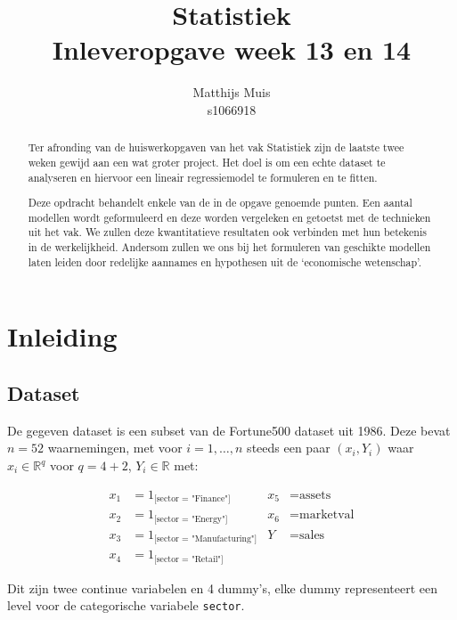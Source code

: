 \documentclass[a4paper]{report}
\author{
	Matthijs Muis \\
	s1066918
}
\title{
	Statistiek \\
	Inleveropgave week 13 en 14
}
\begin{document}
\maketitle

\begin{abstract}
  Ter afronding van de huiswerkopgaven van het vak Statistiek zijn de laatste twee weken gewijd aan een wat groter project. Het doel is om een echte dataset te analyseren en hiervoor een lineair regressiemodel te formuleren en te fitten.

  Deze opdracht behandelt enkele van de in de opgave genoemde punten. Een aantal modellen wordt geformuleerd en deze worden vergeleken en getoetst met de technieken uit het vak. We zullen deze kwantitatieve resultaten ook verbinden met hun betekenis in de werkelijkheid. Andersom zullen we ons bij het formuleren van geschikte modellen laten leiden door redelijke aannames en hypothesen uit de `economische wetenschap'.
\end{abstract}

\newpage

\tableofcontents

\newpage

\chapter{Inleiding}

\section{Dataset}

  De gegeven dataset is een subset van de Fortune500 dataset uit 1986. Deze bevat $n = 52$ waarnemingen, met voor $i = 1, \dots ,n$ steeds een paar $(x_i,Y_i)$ waar $x_i \in \mathbb{R}^q$ voor $q = 4 + 2$, $Y_i \in \mathbb{R}$ met:
  
  \begin{align*}
  x_1 &= 1_{\text{[sector = "Finance"]}} &
  x_5 &= \text{assets} \\
  x_2 &= 1_{\text{[sector = "Energy"]}} &
  x_6 &= \text{marketval} \\
  x_3 &= 1_{\text{[sector = "Manufacturing"]}} &
  Y &= \text{sales} \\
  x_4 &= 1_{\text{[sector = "Retail"]}}
  \end{align*}
  
  Dit zijn twee continue variabelen en 4 dummy's, elke dummy representeert een level voor de categorische variabele \verb!sector!.
  
\end{document}
